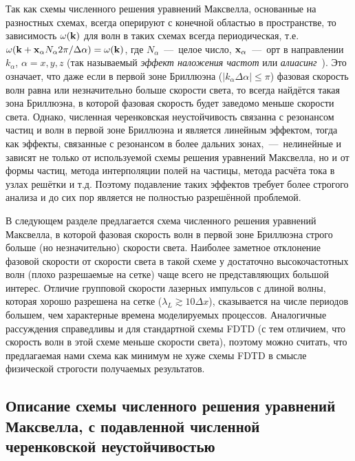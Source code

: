 Так как схемы численного решения уравнений Максвелла, основанные на разностных схемах, всегда оперируют с конечной областью в пространстве, то зависимость $\omega(\vb{k})$ для волн в таких схемах всегда периодическая, т.е.~$\omega(\vb{k}+\vb{x}_\alpha N_\alpha 2 \pi / \Delta \alpha)=\omega(\vb{k})$, где $N_\alpha$~---~целое число, $\vb{x}_\alpha$~---~орт в направлении $k_\alpha$, $\alpha=x,y,z$ (так называемый \textit{эффект наложения частот} или \textit{алиасинг}~\cite{Birdsall1989}).
Это означает, что даже если в первой зоне Бриллюэна ($|k_\alpha \Delta \alpha|\leq\pi$) фазовая скорость волн равна или незначительно больше скорости света, то всегда найдётся такая зона Бриллюэна, в которой фазовая скорость будет заведомо меньше скорости света.
Однако, численная черенковская неустойчивость связанна с резонансом частиц и волн в первой зоне Бриллюэна и является линейным эффектом, тогда как эффекты, связанные с резонансом в более дальних зонах,~---~нелинейные и зависят не только от используемой схемы решения уравнений Максвелла, но и от формы частиц, метода интерполяции полей на частицы, метода расчёта тока в узлах решётки и т.д.
Поэтому подавление таких эффектов требует более строгого анализа и до сих пор является не полностью разрешённой проблемой.

В следующем разделе предлагается схема численного решения уравнений Максвелла, в которой фазовая скорость волн в первой зоне Бриллюэна строго больше (но незначительно) скорости света.
Наиболее заметное отклонение фазовой скорости от скорости света в такой схеме у достаточно высокочастотных волн (плохо разрешаемые на сетке) чаще всего не представляющих большой интерес.
Отличие групповой скорости лазерных импульсов с длиной волны, которая хорошо разрешена на сетке ($\lambda_L \gtrsim 10 \Delta x$), сказывается на числе периодов большем, чем характерные времена моделируемых процессов.
Аналогичные рассуждения справедливы и для стандартной схемы FDTD (с тем отличием, что скорость волн в этой схеме меньше скорости света), поэтому можно считать, что предлагаемая нами схема как минимум не хуже схемы FDTD в смысле физической строгости получаемых результатов.


\subsection{Описание схемы численного решения уравнений Максвелла, с подавленной численной черенковской неустойчивостью}
\label{sub:ch3/sec4/Hybrid}

